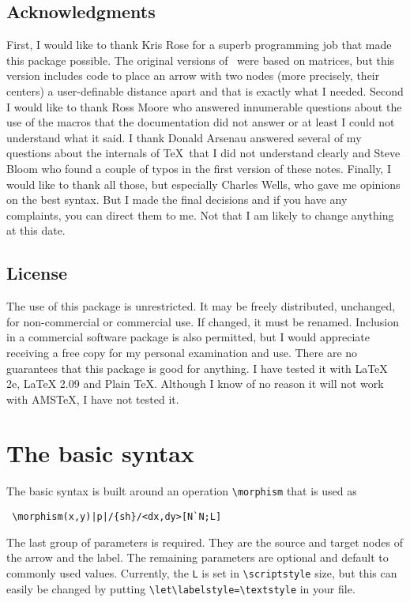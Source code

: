 \documentclass[12pt]{article}
\begin{document}
{\subsection{Acknowledgments}
 First, I would like to thank Kris Rose for a superb programming job
that made this package possible.  The original versions of \xypic\ were
based on matrices, but this version includes code to place an arrow with
two nodes (more precisely, their centers) a user-definable distance
apart and that is exactly what I needed.  Second I would like to thank
Ross Moore who answered innumerable questions about the use of the
macros that the documentation did not answer or at least I could not
understand what it said.  I thank Donald Arsenau answered several of my
questions about the internals of \TeX\ that I did not understand
clearly and Steve Bloom who found a couple
of typos in the first version of these notes.  Finally, I would like to
thank all those, but especially Charles Wells, who gave me opinions on
the best syntax.  But I made the final decisions and if you have any
complaints, you can direct them to me.  Not that I am likely to change
anything at this date.

\subsection{License}
 The use of this package is unrestricted.  It may be freely distributed,
unchanged, for non-commercial or commercial use.  If changed, it must be
renamed.  Inclusion in a commercial software package is also permitted,
but I would appreciate receiving a free copy for my personal examination
and use.  There are no guarantees that this package is good for
anything.  I have tested it with LaTeX 2e, LaTeX 2.09 and Plain TeX.
Although I know of no reason it will not work with AMSTeX, I have not
tested it.


\section{The basic syntax}

The basic syntax is built around an operation
\verb.\morphism.  that is
used as 
 \begin{verbatim}
 \morphism(x,y)|p|/{sh}/<dx,dy>[N`N;L]
 \end{verbatim}
 The last group of parameters is required.  They are the source and
target nodes of the arrow and the label.  The remaining parameters are
optional and default to commonly used values.  Currently, the
\verb.L. is set in \verb.\scriptstyle.
size, but this can easily be changed by putting
\verb.\let\labelstyle=\textstyle. in
your file.

}
\end{document}
